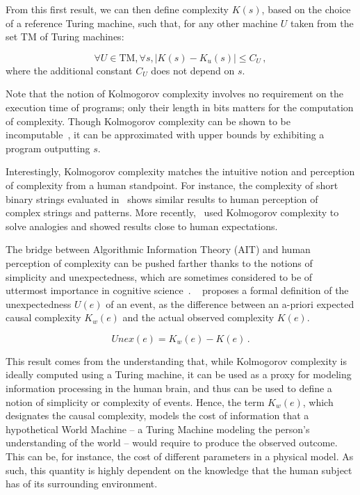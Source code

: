\documentclass[entropy,article,submit,moreauthors,pdftex]{Definitions/mdpi}
\begin{document}
From this first result, we can then define complexity $K(s)$, based on the choice of a reference Turing machine, such that, for any other
machine $U$ taken from the set $\text{TM}$ of Turing machines:

\begin{equation}
    \forall U\in\text{TM}, \forall s, |K(s) - K_{u}(s)| \le C_{U}\,,
\end{equation}
where the additional constant $C_{U}$ does not depend on $s$.

Note that the notion of Kolmogorov complexity involves no requirement on the execution time of
programs; only their length in bits matters for the computation of
complexity. Though Kolmogorov complexity can be shown to be
incomputable~\cite{li_introduction_2008},
it can be approximated with
upper bounds by exhibiting a program outputting $s$.

Interestingly, Kolmogorov complexity matches the intuitive
notion and perception of complexity from a human standpoint. For instance, the
complexity of short binary strings evaluated in~\cite{delahaye_numerical_2012}
shows similar results to human perception of complex strings and patterns. More
recently,~\cite{murena_solving_2020} used Kolmogorov complexity to solve
analogies and showed results close to human expectations.

The bridge between Algorithmic Information Theory (AIT) and human perception of
complexity can be pushed farther thanks to the notions of simplicity and unexpectedness,
which are sometimes considered to be of uttermost importance in cognitive science~\cite
{chater_simplicity_2003}.
~\cite{dessalles_coincidences_2011} proposes a formal definition of the
unexpectedness $U(e)$ of an event, as the difference between an a-priori
expected causal complexity $K_{w}(e)$ and the actual observed complexity $K
    (e)$.

\begin{equation}
    \label{eq:unexpected} \textit{Unex}(e) = K_{w}(e) - K(e)\,.
\end{equation}

This result comes from the understanding that, while Kolmogorov complexity is
ideally computed using a Turing machine, it can be used as a proxy for modeling
information processing in the human brain, and thus can be used to define a notion of
simplicity or complexity of events. Hence, the term $K_w(e)$, which designates the causal complexity, models the cost of information that a hypothetical World Machine -- a Turing Machine modeling the person's understanding of the world -- would require to produce the observed outcome. This can be, for instance, the cost of different parameters in a physical model. As such, this quantity is highly dependent on the knowledge that the human subject has of its surrounding environment.
\end{document}
